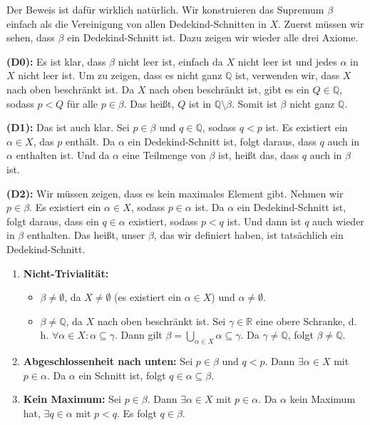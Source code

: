 \begin{spoken-clean}[01:15:30 - 01:18:15]
Der Beweis ist dafür wirklich natürlich. Wir konstruieren das Supremum $\beta$ einfach als die Vereinigung von allen Dedekind-Schnitten in $X$. Zuerst müssen wir sehen, dass $\beta$ ein Dedekind-Schnitt ist. Dazu zeigen wir wieder alle drei Axiome.

\textbf{(D0):} Es ist klar, dass $\beta$ nicht leer ist, einfach da $X$ nicht leer ist und jedes $\alpha$ in $X$ nicht leer ist. Um zu zeigen, dass es nicht ganz $\mathbb{Q}$ ist, verwenden wir, dass $X$ nach oben beschränkt ist. Da $X$ nach oben beschränkt ist, gibt es ein $Q \in \mathbb{Q}$, sodass $p < Q$ für alle $p \in \beta$. Das heißt, $Q$ ist in $\mathbb{Q} \setminus \beta$. Somit ist $\beta$ nicht ganz $\mathbb{Q}$.

\textbf{(D1):} Das ist auch klar. Sei $p \in \beta$ und $q \in \mathbb{Q}$, sodass $q < p$ ist. Es existiert ein $\alpha \in X$, das $p$ enthält. Da $\alpha$ ein Dedekind-Schnitt ist, folgt daraus, dass $q$ auch in $\alpha$ enthalten ist. Und da $\alpha$ eine Teilmenge von $\beta$ ist, heißt das, dass $q$ auch in $\beta$ ist.

\textbf{(D2):} Wir müssen zeigen, dass es kein maximales Element gibt. Nehmen wir $p \in \beta$. Es existiert ein $\alpha \in X$, sodass $p \in \alpha$ ist. Da $\alpha$ ein Dedekind-Schnitt ist, folgt daraus, dass ein $q \in \alpha$ existiert, sodass $p < q$ ist. Und dann ist $q$ auch wieder in $\beta$ enthalten. Das heißt, unser $\beta$, das wir definiert haben, ist tatsächlich ein Dedekind-Schnitt.
\end{spoken-clean}

\begin{math-stroke}
\begin{enumerate}[label=\textbf{(D\arabic*)}, start=0]
    \item \textbf{Nicht-Trivialität:} 
    \begin{itemize}
        \item $\beta \neq \emptyset$, da $X \neq \emptyset$ (es existiert ein $\alpha \in X$) und $\alpha \neq \emptyset$.
        \item $\beta \neq \mathbb{Q}$, da $X$ nach oben beschränkt ist. Sei $\gamma \in \mathbb{R}$ eine obere Schranke, d.\,h. $\forall \alpha \in X \colon \alpha \subseteq \gamma$. Dann gilt $\beta = \bigcup_{\alpha \in X} \alpha \subseteq \gamma$. Da $\gamma \neq \mathbb{Q}$, folgt $\beta \neq \mathbb{Q}$.
    \end{itemize}
    \item \textbf{Abgeschlossenheit nach unten:} Sei $p \in \beta$ und $q < p$. Dann $\exists \alpha \in X$ mit $p \in \alpha$. Da $\alpha$ ein Schnitt ist, folgt $q \in \alpha \subseteq \beta$.
    \item \textbf{Kein Maximum:} Sei $p \in \beta$. Dann $\exists \alpha \in X$ mit $p \in \alpha$. Da $\alpha$ kein Maximum hat, $\exists q \in \alpha$ mit $p < q$. Es folgt $q \in \beta$.
\end{enumerate}
\end{math-stroke}

